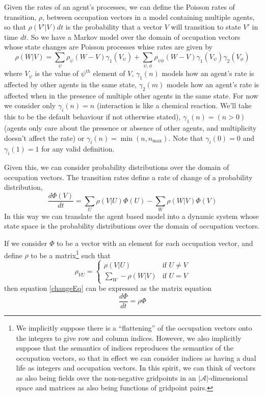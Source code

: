 \documentclass[a4paper]{article}
\begin{document}
Given the rates of an agent's processes, we can define the Poisson rates of transition, $\rho$, between occupation vectors in a model containing multiple agents, so that $\rho(V'|V)dt$ is the probability that a vector $V$ will transition to state $V'$ in time $dt$. So we have a Markov model over the domain of occupation vectors whose state changes are Poisson processes whise rates are given by 
\begin{equation}
\rho(W|V) = \sum_{\psi}  \rho_\psi(W-V) \gamma_1(V_\psi) + \sum_{\psi,\phi}  \rho_{\psi\phi}(W-V) \gamma_1(V_\psi)\gamma_2(V_\phi)
\label{rateEq}
\end{equation}
where $V_\psi$ is the value of $\psi^{th}$ element of $V$, $\gamma_1(n)$ models how an agent's rate is affected by other agents in the same state, $\gamma_2(m)$ models how an agent's rate is affected when in the presence of multiple other agents in the same state. For now we consider only $\gamma_i(n) = n$ (interaction is like a chemical reaction. We'll take this to be the default behaviour if not otherwise stated), $\gamma_1(n) = (n>0)$ (agents only care about the presence or absence of other agents, and multiplicity doesn't affect the rate) or $\gamma_i(n) = \min(n,n_{\text{max}})$. Note that $\gamma_i(0) = 0$ and $\gamma_i(1) = 1$ for any valid definition.

Given this, we can consider probability distributions over the domain of occupation vectors. The transition rates define a rate of change of a probability distribution,
\begin{equation}
\frac{d\Phi(V)}{dt} = \sum_{U} \rho(V|U)\Phi(U) - \sum_W \rho(W|V)\Phi(V)
\label{changeEq}
\end{equation}
In this way we can translate the agent based model into a dynamic system whose state space is the probability distributions over the domain of occupation vectors.

If we consider $\Phi$ to be a vector with an element for each occupation vector, and define $\rho$ to be a matrix\footnote{We implicitly suppose there is a ``flattening'' of the occupation vectors onto the integers to give row and column indices. However, we also implicitly suppose that the semantics of indices reproduces the semantics of the occupation vectors, so that in effect we can consider indices as having a dual life as integers and occupation vectors. In this spirit, we can think of vectors as also being fields over the non-negative gridpoints in an $|\mathcal{A}|$-dimensional space and matrices as also being functions of gridpoint pairs.} such that
\begin{equation}
\rho_{VU} = 
\begin{cases}
	\rho(V|U) & \text{if } U \ne V\\
	\sum_{W} -\rho(W|V) & \text{if } U = V
\end{cases}
\label{rhoMatrixEq}
\end{equation}
then equation \ref{changeEq} can be expressed as the matrix equation
\begin{equation}
	\frac{d\Phi}{dt} = \rho\Phi
	\label{expChangeEq}
\end{equation}
\end{document}
